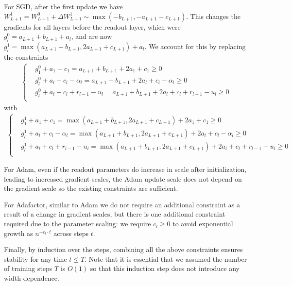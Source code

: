 \documentclass{article}
\theoremstyle{plain}
\theoremstyle{definition}
\theoremstyle{remark}
\begin{document}
For SGD, after the first update we have $W_{L+1}^1 = W_{L+1}^0 + \Delta W_{L+1}^1 \sim \max(-b_{L+1}, -a_{L+1} - c_{L+1})$. This changes the gradients for all layers before the readout layer, which were $g_l^0 = a_{L+1} + b_{L+1} + a_l$, and are now $g_l^1 = \max(a_{L+1} + b_{L+1}, 2a_{L+1} + c_{L+1}) + a_l$. We account for this by replacing the constraints
\begin{align*}
    \begin{cases}
    &g_1^0 + a_1 + c_1 = a_{L+1} + b_{L+1} + 2a_1 + c_1 \geq 0\\
    &g_l^0 + a_l + c_l - \alpha_l = a_{L+1} + b_{L+1} + 2a_l + c_l - \alpha_l \geq 0\\
    &g_l^0 + a_l + c_l + r_{l-1} - u_l = a_{L+1} + b_{L+1} + 2a_l + c_l + r_{l-1} - u_l \geq 0\\
    \end{cases}
\end{align*}
with 
\begin{align*}
    \begin{cases}
    &g_1^1 + a_1 + c_1 = \max(a_{L+1} + b_{L+1}, 2a_{L+1} + c_{L+1}) + 2a_1 + c_1 \geq 0\\
    &g_l^1 + a_l + c_l - \alpha_l = \max(a_{L+1} + b_{L+1}, 2a_{L+1} + c_{L+1}) + 2a_l + c_l - \alpha_l \geq 0\\
    &g_l^1 + a_l + c_l + r_{l-1} - u_l = \max(a_{L+1} + b_{L+1}, 2a_{L+1} + c_{L+1}) + 2a_l + c_l + r_{l-1} - u_l \geq 0\\
    \end{cases}
\end{align*}

For Adam, even if the readout parameters do increase in scale after initialization, leading to increased gradient scales, the Adam update scale does not depend on the gradient scale so the existing constraints are sufficient.

For Adafactor, similar to Adam we do not require an additional constraint as a result of a change in gradient scales, but there is one additional constraint required due to the parameter scaling: we require $c_{l} \geq 0$ to avoid exponential growth as $n^{-c_{l} \cdot t}$ across steps $t$.

Finally, by induction over the steps, combining all the above constraints ensures stability for any time $t \leq T$. Note that it is essential that we assumed the number of training steps $T$ is $O(1)$ so that this induction step does not introduce any width dependence.
\end{document}
